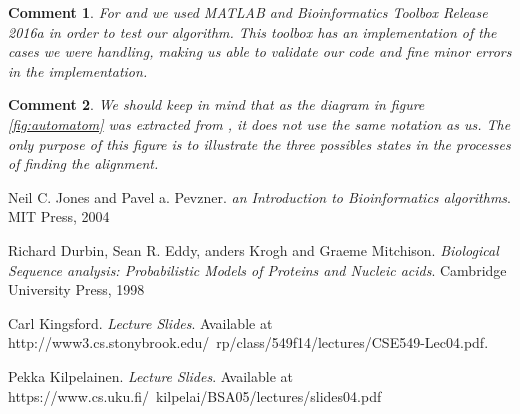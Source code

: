 \documentclass[11pt]{article} %
\theoremstyle{problemstyle}
\theoremstyle{problemstyle}
\newtheorem{commental}{Comment}
\begin{document}
\begin{commental}
For  and  we used MATLAB and Bioinformatics Toolbox Release 2016a in order to test our algorithm. This toolbox has an implementation of the cases we were handling, making us able to validate our code and fine minor errors in the implementation.
\end{commental}

\begin{commental} 
We should keep in mind that as the diagram in figure \ref{fig:automatom} was extracted from \cite{durbin}, it does not use the same notation as us. The only purpose of this figure is to illustrate the three possibles states in the processes of finding the alignment.
\end{commental}

\begin{thebibliography}{3}
	
	Neil C. Jones and Pavel a. Pevzner. 
	\textit{an Introduction to Bioinformatics algorithms}. 
	MIT Press, 2004
	
	Richard Durbin, Sean R. Eddy, anders Krogh and Graeme Mitchison. 
	\textit{Biological Sequence analysis: Probabilistic Models of Proteins and Nucleic acids}. 
	Cambridge University Press, 1998
	
	 Carl Kingsford. 
	\textit{Lecture Slides}. 
	 Available at \\ http://www3.cs.stonybrook.edu/~rp/class/549f14/lectures/CSE549-Lec04.pdf.
	
	Pekka Kilpelainen. 
	\textit{Lecture Slides}. 
	Available at\\ https://www.cs.uku.fi/~kilpelai/BSA05/lectures/slides04.pdf
\end{thebibliography}
\end{document}
